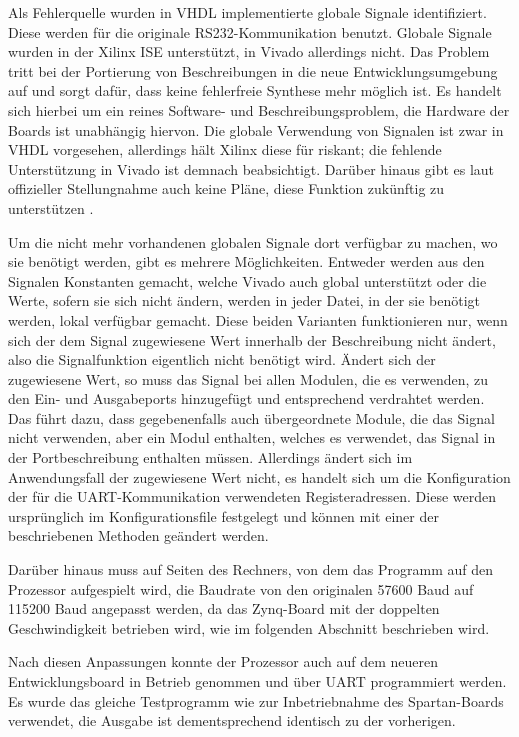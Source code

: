 \documentclass[11pt,a4paper,titlepage]{article}
\begin{document}
Als Fehlerquelle wurden in VHDL implementierte globale Signale identifiziert. Diese werden für die originale RS232-Kommunikation benutzt. Globale Signale wurden in der Xilinx ISE unterstützt, in Vivado allerdings nicht. Das Problem tritt bei der Portierung von Beschreibungen in die neue Entwicklungsumgebung auf und sorgt dafür, dass keine fehlerfreie Synthese mehr möglich ist. Es handelt sich hierbei um ein reines Software- und Beschreibungsproblem, die Hardware der Boards ist unabhängig hiervon. Die globale Verwendung von Signalen ist zwar in VHDL vorgesehen, allerdings hält Xilinx diese für riskant; die fehlende Unterstützung in Vivado ist demnach beabsichtigt. Darüber hinaus gibt es laut offizieller Stellungnahme auch keine Pläne, diese Funktion zukünftig zu unterstützen \cite{VivadoGlobalSignals}.

Um die nicht mehr vorhandenen globalen Signale dort verfügbar zu machen, wo sie benötigt werden, gibt es mehrere Möglichkeiten. Entweder werden aus den Signalen Konstanten gemacht, welche Vivado auch global unterstützt oder die Werte, sofern sie sich nicht ändern, werden in jeder Datei, in der sie benötigt werden, lokal verfügbar gemacht. Diese beiden Varianten funktionieren nur, wenn sich der dem Signal zugewiesene Wert innerhalb der Beschreibung nicht ändert, also die Signalfunktion eigentlich nicht benötigt wird. Ändert sich der zugewiesene Wert, so muss das Signal bei allen Modulen, die es verwenden, zu den Ein- und Ausgabeports hinzugefügt und entsprechend verdrahtet werden. Das führt dazu, dass gegebenenfalls auch übergeordnete Module, die das Signal nicht verwenden, aber ein Modul enthalten, welches es verwendet, das Signal in der Portbeschreibung enthalten müssen.
Allerdings ändert sich im Anwendungsfall der zugewiesene Wert nicht, es handelt sich um die Konfiguration der für die UART-Kommunikation verwendeten Registeradressen. Diese werden ursprünglich im Konfigurationsfile festgelegt und können mit einer der beschriebenen Methoden geändert werden.

Darüber hinaus muss auf Seiten des Rechners, von dem das Programm auf den Prozessor aufgespielt wird, die Baudrate von den originalen 57600 Baud auf 115200 Baud angepasst werden, da das Zynq-Board mit der doppelten Geschwindigkeit betrieben wird, wie im folgenden Abschnitt beschrieben wird.

Nach diesen Anpassungen konnte der Prozessor auch auf dem neueren Entwicklungsboard in Betrieb genommen und über UART programmiert werden. Es wurde das gleiche Testprogramm wie zur Inbetriebnahme des Spartan-Boards verwendet, die Ausgabe ist dementsprechend identisch zu der vorherigen.
\end{document}
